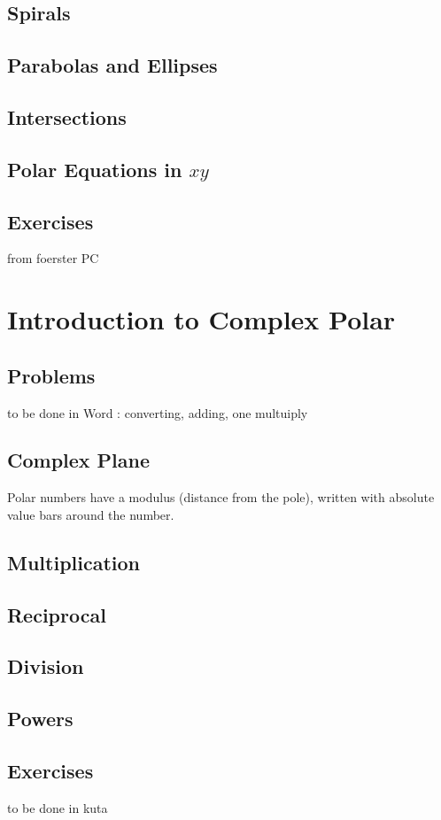 \subsection{Spirals}
\subsection{Parabolas and Ellipses}
\subsection{Intersections}
\subsection{Polar Equations in $xy$}
\newpage
\subsection{Exercises}
from foerster PC


\newpage
\section{Introduction to Complex Polar}
\subsection{Problems}
to be done in Word : converting, adding, one multuiply
\newpage
\subsection{Complex Plane}
Polar numbers have a modulus (distance from the pole), written with absolute value
bars around the number. 
\subsection{Multiplication}
\subsection{Reciprocal}
\subsection{Division}
\subsection{Powers}
\newpage
\subsection{Exercises}
to be done in kuta


